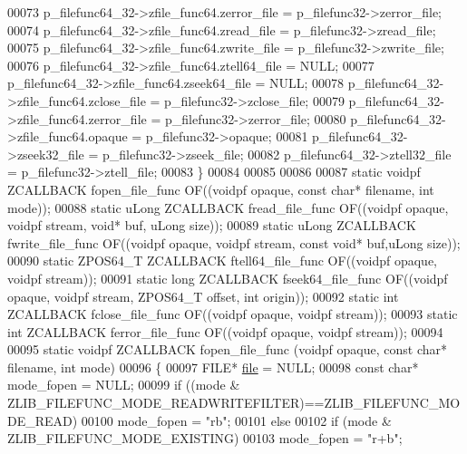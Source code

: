 \begin{DoxyCode}
00073     p\_filefunc64\_32->zfile\_func64.zerror\_file = p\_filefunc32->zerror\_file;
00074     p\_filefunc64\_32->zfile\_func64.zread\_file = p\_filefunc32->zread\_file;
00075     p\_filefunc64\_32->zfile\_func64.zwrite\_file = p\_filefunc32->zwrite\_file;
00076     p\_filefunc64\_32->zfile\_func64.ztell64\_file = NULL;
00077     p\_filefunc64\_32->zfile\_func64.zseek64\_file = NULL;
00078     p\_filefunc64\_32->zfile\_func64.zclose\_file = p\_filefunc32->zclose\_file;
00079     p\_filefunc64\_32->zfile\_func64.zerror\_file = p\_filefunc32->zerror\_file;
00080     p\_filefunc64\_32->zfile\_func64.opaque = p\_filefunc32->opaque;
00081     p\_filefunc64\_32->zseek32\_file = p\_filefunc32->zseek\_file;
00082     p\_filefunc64\_32->ztell32\_file = p\_filefunc32->ztell\_file;
00083 \}
00084 
00085 
00086 
00087 \textcolor{keyword}{static} voidpf  ZCALLBACK fopen\_file\_func OF((voidpf opaque, \textcolor{keyword}{const} \textcolor{keywordtype}{char}* filename, \textcolor{keywordtype}{int} mode));
00088 \textcolor{keyword}{static} uLong   ZCALLBACK fread\_file\_func OF((voidpf opaque, voidpf stream, \textcolor{keywordtype}{void}* buf, uLong size));
00089 \textcolor{keyword}{static} uLong   ZCALLBACK fwrite\_file\_func OF((voidpf opaque, voidpf stream, \textcolor{keyword}{const} \textcolor{keywordtype}{void}* buf,uLong size));
00090 \textcolor{keyword}{static} ZPOS64\_T ZCALLBACK ftell64\_file\_func OF((voidpf opaque, voidpf stream));
00091 \textcolor{keyword}{static} \textcolor{keywordtype}{long}    ZCALLBACK fseek64\_file\_func OF((voidpf opaque, voidpf stream, ZPOS64\_T offset, \textcolor{keywordtype}{int} origin));
00092 \textcolor{keyword}{static} \textcolor{keywordtype}{int}     ZCALLBACK fclose\_file\_func OF((voidpf opaque, voidpf stream));
00093 \textcolor{keyword}{static} \textcolor{keywordtype}{int}     ZCALLBACK ferror\_file\_func OF((voidpf opaque, voidpf stream));
00094 
00095 \textcolor{keyword}{static} voidpf ZCALLBACK fopen\_file\_func (voidpf opaque, \textcolor{keyword}{const} \textcolor{keywordtype}{char}* filename, \textcolor{keywordtype}{int} mode)
00096 \{
00097     FILE* \hyperlink{structfile}{file} = NULL;
00098     \textcolor{keyword}{const} \textcolor{keywordtype}{char}* mode\_fopen = NULL;
00099     \textcolor{keywordflow}{if} ((mode & ZLIB\_FILEFUNC\_MODE\_READWRITEFILTER)==ZLIB\_FILEFUNC\_MODE\_READ)
00100         mode\_fopen = \textcolor{stringliteral}{"rb"};
00101     \textcolor{keywordflow}{else}
00102     \textcolor{keywordflow}{if} (mode & ZLIB\_FILEFUNC\_MODE\_EXISTING)
00103         mode\_fopen = \textcolor{stringliteral}{"r+b"};

\end{DoxyCode}

